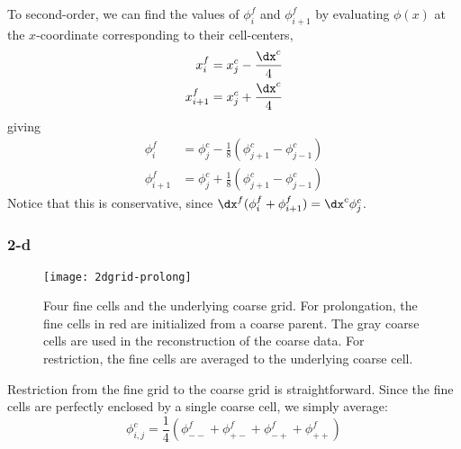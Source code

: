 To second-order, we can find the values of $\phi^f_i$ and
$\phi^f_{i+1}$  by evaluating $\phi(x)$ at the $x$-coordinate corresponding to their
cell-centers,
\begin{align}
x^f_i &= x^c_j - \frac{\dx^c}{4} \\
x^f_{i+1} &= x^c_j + \frac{\dx^c}{4}
\end{align}
giving
\begin{align}
\phi^f_i     &= \phi^c_j - \frac{1}{8} (\phi^c_{j+1} - \phi^c_{j-1}) \\
\phi^f_{i+1} &= \phi^c_j + \frac{1}{8} (\phi^c_{j+1} - \phi^c_{j-1}) 
\end{align}
Notice that this is conservative, since $\dx^f (\phi^f_i + \phi^f_{i+1}) = \dx^c \phi^c_j$.

\subsubsection{2-d}

\begin{figure}[t]
\centering
\texttt{[image: 2dgrid-prolong]}
\caption[The geometry for 2-d
  prolongation and restriction]{\label{fig:2dgrid-prolong} Four fine cells and the
  underlying coarse grid.  For prolongation, the fine cells in red are
  initialized from a coarse parent.  The gray coarse cells are used in
  the reconstruction of the coarse data.  For restriction, the fine
  cells are averaged to the underlying coarse cell.}
\end{figure}


Restriction from the fine grid to the coarse grid is straightforward.
Since the fine cells are perfectly enclosed by a single coarse cell,
we simply average:
\begin{equation}
\phi_{i,j}^c = \frac{1}{4} ( \phi_{--}^f + \phi_{+-}^f +
                             \phi_{-+}^f + \phi_{++}^f )
\end{equation}

